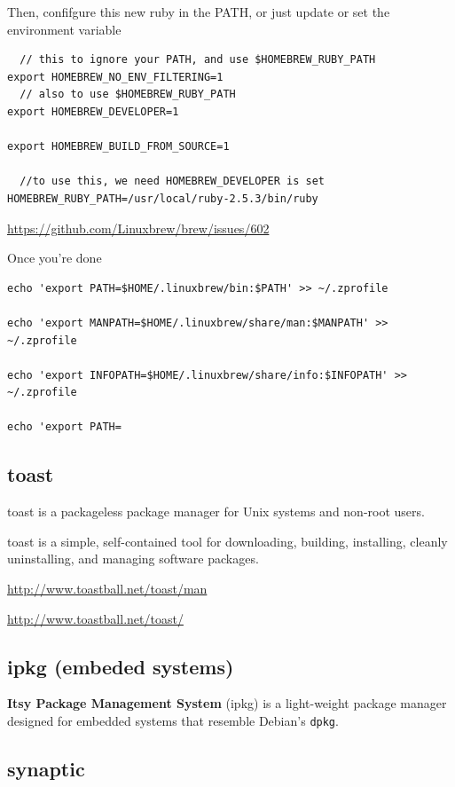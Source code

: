 Then, confifgure this new ruby in the PATH, or just update or set the environment variable
\begin{verbatim}
  // this to ignore your PATH, and use $HOMEBREW_RUBY_PATH
export HOMEBREW_NO_ENV_FILTERING=1
  // also to use $HOMEBREW_RUBY_PATH
export HOMEBREW_DEVELOPER=1

export HOMEBREW_BUILD_FROM_SOURCE=1

  //to use this, we need HOMEBREW_DEVELOPER is set
HOMEBREW_RUBY_PATH=/usr/local/ruby-2.5.3/bin/ruby
\end{verbatim}
\url{https://github.com/Linuxbrew/brew/issues/602}


Once you're done
\begin{verbatim}
echo 'export PATH=$HOME/.linuxbrew/bin:$PATH' >> ~/.zprofile

echo 'export MANPATH=$HOME/.linuxbrew/share/man:$MANPATH' >> ~/.zprofile

echo 'export INFOPATH=$HOME/.linuxbrew/share/info:$INFOPATH' >> ~/.zprofile

echo 'export PATH=
\end{verbatim}

\subsection{toast}
\label{sec:toast}

toast is a packageless package manager for Unix systems and non-root users.

toast is a simple, self-contained tool for downloading, building, installing,
cleanly uninstalling, and managing software packages.

\url{http://www.toastball.net/toast/man}

\url{http://www.toastball.net/toast/}



\subsection{ipkg (embeded systems)}
\label{sec:ipkg}

{\bf Itsy Package Management System} (ipkg) is a light-weight package manager
designed for embedded systems that resemble Debian's \verb!dpkg!.

\subsection{synaptic}
\label{sec:synaptic}

